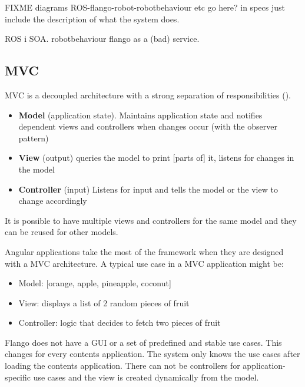 FIXME diagrams ROS-flango-robot-robotbehaviour etc go here? in specs  just include the description of what the system does.

ROS i SOA.
robotbehaviour
flango as a (bad) service.



\subsection{MVC}
\ac{MVC} is a decoupled architecture with a strong separation of responsibilities ().
\begin{itemize}
    \item \textbf{Model} (application state). Maintains application state and notifies dependent views and controllers when changes occur (with the observer pattern)
    \item \textbf{View} (output) queries the model to print [parts of] it, listens for changes in the model
    \item \textbf{Controller} (input) Listens for input and tells the model or the view to change accordingly
\end{itemize}

It is possible to have multiple views and controllers for the same model and they can be reused for other models.

Angular applications take the most of the framework when they are designed with a \ac{MVC} architecture.
A typical use case in a \ac{MVC} application might be:
\begin{itemize}
    \item Model: [orange, apple, pineapple, coconut]
    \item View: displays a list of 2 random pieces of fruit
    \item Controller: logic that decides to fetch two pieces of fruit
\end{itemize}

Flango \cm does not have a \ac{GUI} or a set of predefined and stable use cases.
This changes for every contents application.
The system only knows the use cases after loading the contents application.
There can not be controllers for application-specific use cases and the view is created dynamically from the model.


